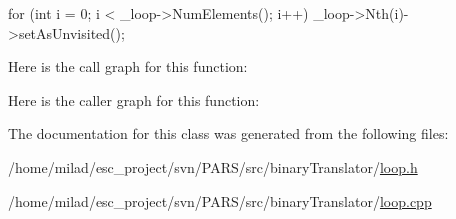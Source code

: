 \begin{DoxyCode}
                          {
        for (int i = 0; i < _loop->NumElements(); i++) {
                _loop->Nth(i)->setAsUnvisited();
        }
}
\end{DoxyCode}


Here is the call graph for this function:




Here is the caller graph for this function:




The documentation for this class was generated from the following files:\begin{DoxyCompactItemize}
\item 
/home/milad/esc\_\-project/svn/PARS/src/binaryTranslator/\hyperlink{loop_8h}{loop.h}\item 
/home/milad/esc\_\-project/svn/PARS/src/binaryTranslator/\hyperlink{loop_8cpp}{loop.cpp}\end{DoxyCompactItemize}
